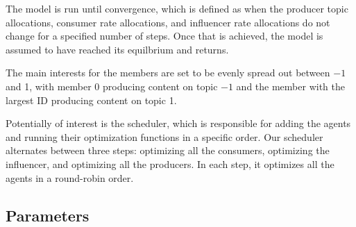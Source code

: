 \documentclass[11pt, letterpaper]{article}
\begin{document}
The model is run until convergence, which is defined as when the producer topic allocations, consumer rate allocations, and influencer rate allocations do not change for a specified number of steps. Once that is achieved, the model is assumed to have reached its equilbrium and returns.

The main interests for the members are set to be evenly spread out between \(-1\) and 1, with member 0 producing content on topic \(-1\) and the member with the largest ID producing content on topic 1. 

Potentially of interest is the scheduler, which is responsible for adding the agents and running their optimization functions in a specific order. Our scheduler alternates between three steps: optimizing all the consumers, optimizing the influencer, and optimizing all the producers. In each step, it optimizes all the agents in a round-robin order. 

\subsection{Parameters}
\end{document}
